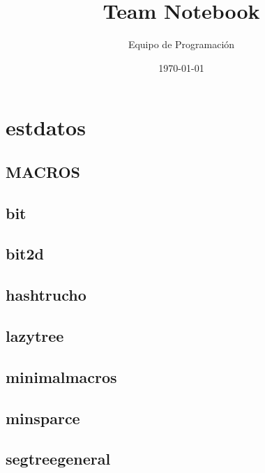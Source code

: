 \documentclass{article}
\begin{document}
\title{Team Notebook}
\author{Equipo de Programación}
\date{\today}
\maketitle
\tableofcontents
\newpage
\section{estdatos}
\subsection{MACROS}


\subsection{bit}


\subsection{bit2d}


\subsection{hashtrucho}


\subsection{lazytree}


\subsection{minimalmacros}


\subsection{minsparce}


\subsection{segtreegeneral}

\end{document}
